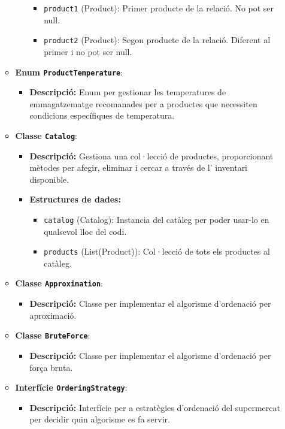 \documentclass[a4paper,12pt]{report}
\begin{document}
\begin{itemize}
\begin{itemize}
\begin{itemize}
\begin{itemize}
					\item \texttt{product1} (Product): Primer producte de la relació. No pot ser null.
					\item \texttt{product2} (Product): Segon producte de la relació. Diferent al primer i no pot ser null.
				\end{itemize}
		\end{itemize}
\item \textbf{Enum \texttt{ProductTemperature}}:
		\begin{itemize}
			\item \textbf{Descripció:} Enum per gestionar les temperatures de emmagatzematge recomanades per a productes que necessiten condicions específiques de temperatura.
		\end{itemize}
\item \textbf{Classe \texttt{Catalog}}:
		\begin{itemize}
			\item \textbf{Descripció:} Gestiona una col·lecció de productes, proporcionant mètodes per afegir, eliminar i cercar a través de l' inventari disponible.
			\item \textbf{Estructures de dades:}
				\begin{itemize}
					\item \texttt{catalog} (Catalog): Instancia del catàleg per poder usar-lo en qualsevol lloc del codi.
					\item \texttt{products} (List(Product)): Col·lecció de tots els productes al catàleg.
				\end{itemize}
		\end{itemize} 
\item \textbf{Classe \texttt{Approximation}}:
		\begin{itemize}
			\item \textbf{Descripció:} Classe per implementar el algorisme d'ordenació per aproximació.
		\end{itemize}
\item \textbf{Classe \texttt{BruteForce}}:
		\begin{itemize}
			\item \textbf{Descripció:} Classe per implementar el algorisme d'ordenació per força bruta.
		\end{itemize}
\item \textbf{Interfície \texttt{OrderingStrategy}}:
		\begin{itemize}
			\item \textbf{Descripció:} Interfície per a estratègies d'ordenació del supermercat per decidir quin algorisme es fa servir.

\end{itemize}
\end{itemize}
\end{itemize}
\end{document}
